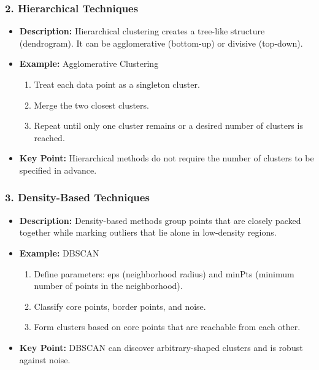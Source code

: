 \documentclass[aspectratio=169]{beamer}
\begin{document}
\begin{frame}[fragile]
    \frametitle{2. Hierarchical Techniques}
    \begin{itemize}
        \item \textbf{Description:} Hierarchical clustering creates a tree-like structure (dendrogram). It can be agglomerative (bottom-up) or divisive (top-down).
        \item \textbf{Example:} Agglomerative Clustering
        \begin{enumerate}
            \item Treat each data point as a singleton cluster.
            \item Merge the two closest clusters.
            \item Repeat until only one cluster remains or a desired number of clusters is reached.
        \end{enumerate}
        \item \textbf{Key Point:} Hierarchical methods do not require the number of clusters to be specified in advance.
    \end{itemize}
\end{frame}

\begin{frame}[fragile]
    \frametitle{3. Density-Based Techniques}
    \begin{itemize}
        \item \textbf{Description:} Density-based methods group points that are closely packed together while marking outliers that lie alone in low-density regions.
        \item \textbf{Example:} DBSCAN
        \begin{enumerate}
            \item Define parameters: eps (neighborhood radius) and minPts (minimum number of points in the neighborhood).
            \item Classify core points, border points, and noise.
            \item Form clusters based on core points that are reachable from each other.
        \end{enumerate}
        \item \textbf{Key Point:} DBSCAN can discover arbitrary-shaped clusters and is robust against noise.
    \end{itemize}
\end{frame}
\end{document}
